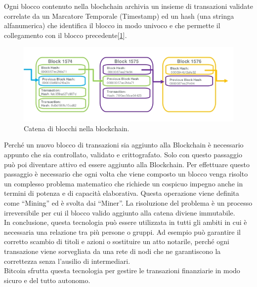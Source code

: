 Ogni blocco contenuto nella blochchain archivia un insieme di transazioni validate correlate da un Marcatore Temporale (Timestamp) ed un hash (una stringa alfanumerica) che identifica il blocco in modo univoco e che permette il collegamento con il blocco precedente[\ref{fig:blockChain}].

\begin{figure}[H]
	\centering
	\includegraphics[width=\textwidth]{images/blockChain.png}
	\caption{Catena di blocchi nella blockchain.}
	\label{fig:blockChain}
\end{figure}

Perché un nuovo blocco di transazioni sia aggiunto alla Blockchain è necessario appunto che sia controllato, validato e crittografato. Solo con questo passaggio può poi diventare attivo ed essere aggiunto alla Blockchain. Per effettuare questo passaggio è necessario che ogni volta che viene composto un blocco venga risolto un complesso problema matematico che richiede un cospicuo impegno anche in termini di potenza e di capacità elaborativa. Questa operazione viene definita come “Mining” ed è svolta dai “Miner”. La risoluzione del problema è un processo irreversibile per cui il blocco valido aggiunto alla catena diviene immutabile.
\\In conclusione, questa tecnologia può essere utilizzata in tutti gli ambiti in cui è necessaria una relazione tra più persone o gruppi. Ad esempio può garantire il corretto scambio di titoli e azioni o sostituire un atto notarile, perché ogni transazione viene sorvegliata da una rete di nodi che ne garantiscono la correttezza senza l’ausilio di intermediari.
\\Bitcoin sfrutta questa tecnologia per gestire le transazioni finanziarie in modo sicuro e del tutto autonomo.